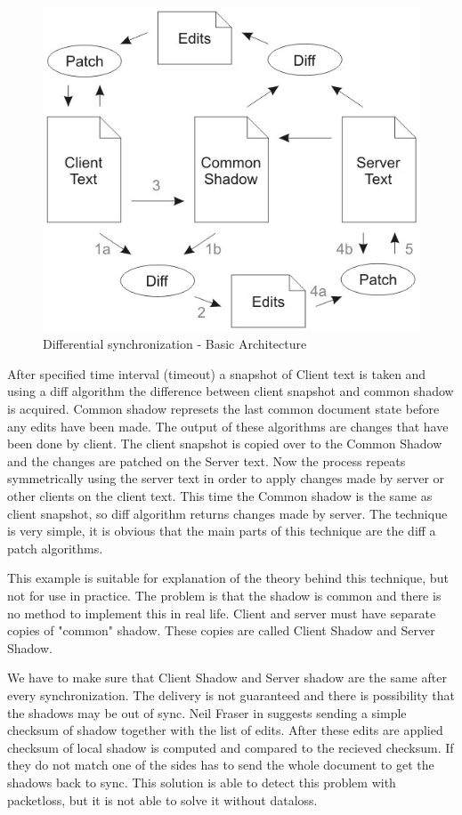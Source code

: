 \documentclass[12pt,oneside]{fithesis2}
\begin{document}
\begin{figure}[H]
\caption{Differential synchronization - Basic Architecture \cite{Fraser}}
\label{fig:ds1}
\centering
\vspace{5mm}
\includegraphics[scale=0.55]{diff1}
\end{figure}
After specified time interval (timeout) a snapshot of Client text is taken and using a diff algorithm the difference between client snapshot and common shadow is acquired. Common shadow represets the last common document state before any edits have been made. The output of these algorithms are changes that have been done by client. The client snapshot is copied over to the Common Shadow and the changes are patched on the Server text. Now the process repeats symmetrically using the server text in order to apply changes made by server or other clients on the client text. This time the Common shadow is the same as client snapshot, so diff algorithm returns changes made by server. The technique is very simple, it is obvious that the main parts of this technique are the diff a patch algorithms.
\par This example is suitable for explanation of the theory behind this technique, but not for use in practice. The problem is that the shadow is common and there is no method to implement this in real life. Client and server must have separate copies of "common" shadow. These copies are called Client Shadow and Server Shadow.
\par We have to make sure that Client Shadow and Server shadow are the same after every synchronization. The delivery is not guaranteed and there is possibility that the shadows may be out of sync. Neil Fraser in \cite{Fraser} suggests sending a simple checksum of shadow together with the list of edits. After these edits are applied checksum of local shadow is computed and compared to the recieved checksum. If they do not match one of the sides has to send the whole document to get the shadows back to sync. This solution is able to detect this problem with packetloss, but it is not able to solve it without dataloss.
\end{document}
